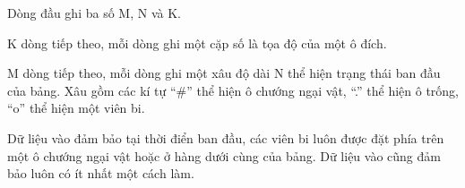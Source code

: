 Dòng đầu ghi ba số M, N và K.

K dòng tiếp theo, mỗi dòng ghi một cặp số là tọa độ của một ô đích.

M dòng tiếp theo, mỗi dòng ghi một xâu độ dài N thể hiện trạng thái ban đầu của bảng. Xâu gồm các kí tự “\#” thể hiện ô chướng ngại vật, “.” thể hiện ô trống, “o” thể hiện một viên bi.

Dữ liệu vào đảm bảo tại thời điển ban đầu, các viên bi luôn được đặt phía trên một ô chướng ngại vật hoặc ở hàng dưới cùng của bảng. Dữ liệu vào cũng đảm bảo luôn có ít nhất một cách làm.

\